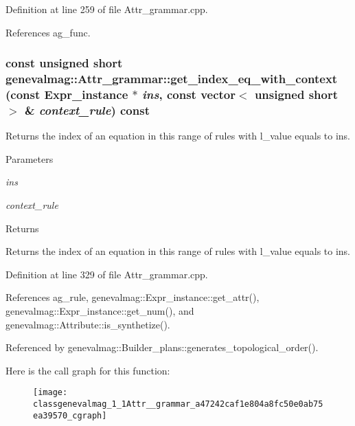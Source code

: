 Definition at line 259 of file Attr\_\-grammar.cpp.



References ag\_\-func.

\hypertarget{classgenevalmag_1_1Attr__grammar_a47242caf1e804a8fc50e0ab75ea39570}{
\subsubsection[{get\_\-index\_\-eq\_\-with\_\-context}]{\setlength{\rightskip}{0pt plus 5cm}const unsigned short genevalmag::Attr\_\-grammar::get\_\-index\_\-eq\_\-with\_\-context (const {\bf Expr\_\-instance} $\ast$ {\em ins}, \/  const vector$<$ unsigned short $>$ \& {\em context\_\-rule}) const}}
\label{classgenevalmag_1_1Attr__grammar_a47242caf1e804a8fc50e0ab75ea39570}
Returns the index of an equation in this range of rules with l\_\-value equals to ins. 
\begin{DoxyParams}{Parameters}
\item[{\em ins}]\item[{\em context\_\-rule}]\end{DoxyParams}
\begin{DoxyReturn}{Returns}

\end{DoxyReturn}
Returns the index of an equation in this range of rules with l\_\-value equals to ins. 

Definition at line 329 of file Attr\_\-grammar.cpp.



References ag\_\-rule, genevalmag::Expr\_\-instance::get\_\-attr(), genevalmag::Expr\_\-instance::get\_\-num(), and genevalmag::Attribute::is\_\-synthetize().



Referenced by genevalmag::Builder\_\-plans::generates\_\-topological\_\-order().



Here is the call graph for this function:\nopagebreak
\begin{figure}[H]
\begin{center}
\leavevmode
\texttt{[image: classgenevalmag\_1\_1Attr\_\_grammar\_a47242caf1e804a8fc50e0ab75ea39570\_cgraph]}
\end{center}
\end{figure}




